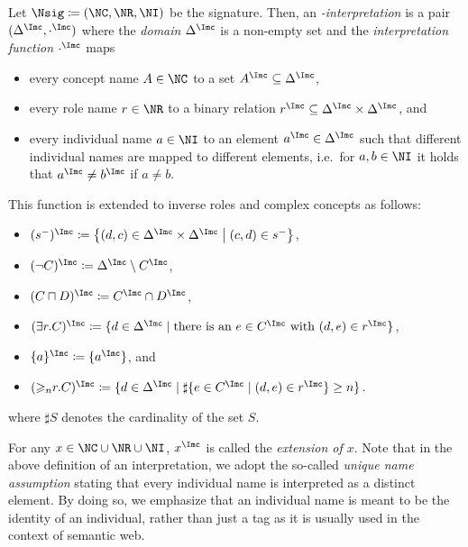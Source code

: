 \begin{definition}
  \label{def:n-interpretation}
  Let $\Nsig\coloneqq(\NC,\NR,\NI)$ be the signature. Then, an \emph{\Nsig-interpretation \I} is a pair
  $(\Delta^{\I}, \cdot^{\I})$ where the \emph{domain} $\Delta^{\I}$ is a non-empty set and
  the \emph{interpretation function} $\cdot^{\I}$ maps
  \begin{itemize}
  \item every concept name $A\in\NC$ to a set $A^{\I}\subseteq\Delta^{\I}$,
  \item every role name $r\in\NR$ to a binary relation
    $r^{\I}\subseteq\Delta^{\I}\times\Delta^{\I}$, and
  \item every individual name $a\in\NI$ to an element $a^{\I}\in\Delta^{\I}$ such that different
    individual names are mapped to different elements, i.e.\ for $a,b\in\NI$ it holds that
    $a^{\I}\neq b^{\I}$ if $a\neq b$.
  \end{itemize}
  This function is extended to inverse roles and complex concepts as follows:
  \begin{itemize}
  \item $(s^{-})^{\I} \coloneqq \left\{(d,c)\in\Delta^{\I}\times\Delta^{\I}\mmid (c,d)\in
      s^{-}\right\}$,
  \item $(\lnot C)^{\I} \coloneqq \Delta^{\I} \setminus C^{\I}$,
  \item $(C \sqcap D)^{\I} \coloneqq C^{\I} \cap D^{\I}$,
  \item $(\exists r.C)^{\I} \coloneqq \{d \in \Delta^\I \mid \text{there is an}\ e \in C^\I \
    \text{with}\ (d,e)\in r^\I\}$,
  \item $\{a\}^{\I} \coloneqq \{a^{\I}\}$, and
  \item $(\atleast{n}{r}{C})^{\I} \coloneqq \{d \in \Delta^{\I} \mid \sharp\{e\in C^{\I}\mid (d,e)\in r^{\I}\}\ge n\}$.
  \end{itemize}
  where $\sharp S$ denotes the cardinality of the set $S$.
\end{definition}

\noindent
For any $x\in\NC\cup\NR\cup\NI$, $x^{\I}$ is called the \emph{extension of $x$}.  Note that in the
above definition of an interpretation, we adopt the so-called \emph{unique name assumption} stating
that every individual name is interpreted as a distinct element. By doing so, we emphasize that an
individual name is meant to be the identity of an individual, rather than just a tag as it is
usually used in the context of semantic web.

